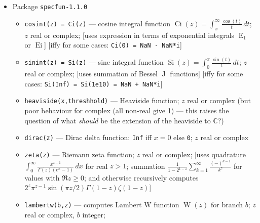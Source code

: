 \documentclass[10pt,dvipdfmx,letterpaper,twoside]{article}
\let\O=\operatorname
\newcommand{\CC}{{\mathbb{C}}}
\let\Gam=\Gamma
\begin{document}
\begin{itemize}
\begin{itemize}
\begin{itemize}
        {\tt sec(z)}, {\tt csc(z)}, {\tt cot(z)}, {\tt sech(z)}, {\tt csch(z)}, {\tt coth(z)}
    \item {\tt acos(z)}, {\tt asin(z)}, {\tt atan(z)}, {\tt acosh(z)}, {\tt asinh(z)}, {\tt atanh(z)},
        {\tt asec(z)}, {\tt acsc(z)}, {\tt acot(z)}, {\tt asech(z)}, {\tt acsch(z)}, {\tt acoth(z)}
    \item {\tt atan2(y,x)}, {\tt abs(z)}, {\tt arg(z)}, {\tt conj(z)}, {\tt real(z)}, {\tt imag(z)}
    \item {\tt sind(z)}, {\tt cosd(z)}, {\tt tand(z)}, {\tt secd(z)}, {\tt cscd(z)}, {\tt cotd(z)},
        {\tt asind(z)}, {\tt acosd(z)}, {\tt atand(z)}, {\tt asecd(z)}, {\tt acscd(z)}, {\tt acotd(z)}
    \item {\tt ceil(z)}, {\tt fix(z)}, {\tt floor(z)}, {\tt round(z)}, {\tt roundb(z)},
        {\tt max(z1...zn)}, {\tt min(z1...zn)}, {\tt hypot(z1...zn)}
    \end{itemize}
  \end{itemize}
\item Package {\tt specfun-1.1.0}
  \begin{itemize}
  \item {\tt cosint(z) = Ci(z)} --- cosine integral function $\O{Ci}(z)=\int_x^\infty\frac{\cos(t)}{t}\,dt$; $z$ real or complex;
      [uses expression in terms of exponential integrals $\O{E}_1$ or $\O{Ei}$]
      [iffy for some cases: {\tt Ci(0) = NaN - NaN*i}]
  \item {\tt sinint(z) = Si(z)} --- sine integral function $\O{Si}(z)=\int_0^x\frac{\sin(t)}{t}\,dt$; $z$ real or complex;
      [uses summation of Bessel $\O{J}$ functions]
      [iffy for some cases: {\tt Si(Inf) = Si(1e10) = NaN + NaN*i}]
  \item {\tt heaviside(x,threshhold)} --- Heaviside function; $z$ real or complex
      (but poor behaviour for complex (all non-real give 1) --- this raises the question of what {\it should} be the extension of
      the heaviside to $\CC$?)
  \item {\tt dirac(z)} --- Dirac delta function: {\tt Inf} iff $x=0$ else {\tt 0}; $z$ real or complex
  \item {\tt zeta(z)} --- Riemann zeta function; $z$ real or complex;
      [uses quadrature $\int_0^\infty\frac{x^{z-1}}{\Gam(z)(e^{x}-1)}\,dx$ for real $z>1$;
      summation $\frac{1}{1-2^{1-z}}\sum_{k=1}^\infty \frac{(-)^{k-1}}{k^{z}}$ for values with $\Re z\geq0$;
      and otherwise recursively computes $2^{z}\pi^{z-1}\sin(\pi z/2)\Gam(1-z)\zeta(1-z)$]
  \item {\tt lambertw(b,z)} --- computes Lambert W function $\O{W}(z)$ for branch $b$; $z$ real or complex, $b$ integer;

\end{itemize}
\end{itemize}
\end{document}
